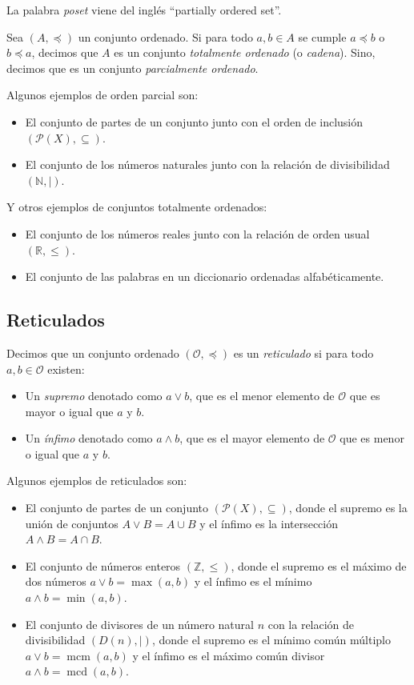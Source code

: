La palabra \textit{poset} viene del inglés ``partially ordered set''.

\begin{definition}
    Sea $(A, \preceq)$ un conjunto ordenado. Si para todo $a, b \in A$ se cumple $a \preceq b$ o $b \preceq a$, decimos que $A$ es un conjunto \emph{totalmente ordenado} (o \emph{cadena}). Sino, decimos que es un conjunto \emph{parcialmente ordenado}.
\end{definition}

Algunos ejemplos de orden parcial son:
\begin{itemize}
    \item El conjunto de partes de un conjunto junto con el orden de inclusión $(\mathcal{P}(X), \subseteq)$.
    \item El conjunto de los números naturales junto con la relación de divisibilidad $(\mathbb{N}, \mid)$.
\end{itemize}
Y otros ejemplos de conjuntos totalmente ordenados:
\begin{itemize}
    \item El conjunto de los números reales junto con la relación de orden usual $(\mathbb{R}, \leq)$.
    \item El conjunto de las palabras en un diccionario ordenadas alfabéticamente.
\end{itemize}


\subsection{Reticulados}

\begin{definition}
    Decimos que un conjunto ordenado $(\mathcal{O}, \preceq)$ es un \emph{reticulado} si para todo $a, b \in \mathcal{O}$ existen:
    \begin{itemize}
        \item Un \emph{supremo} denotado como $a \vee b$, que es el menor elemento de $\mathcal{O}$ que es mayor o igual que $a$ y $b$.
        \item Un \emph{ínfimo} denotado como $a \wedge b$, que es el mayor elemento de $\mathcal{O}$ que es menor o igual que $a$ y $b$.
    \end{itemize}
\end{definition}

Algunos ejemplos de reticulados son:
\begin{itemize}
    \item El conjunto de partes de un conjunto $(\mathcal{P}(X), \subseteq)$, donde el supremo es la unión de conjuntos $A \vee B = A \cup B$ y el ínfimo es la intersección $A \wedge B = A \cap B$.
    \item El conjunto de números enteros $(\mathbb{Z}, \leq)$, donde el supremo es el máximo de dos números $a \vee b = \max(a, b)$ y el ínfimo es el mínimo $a \wedge b = \min(a, b)$.
    \item El conjunto de divisores de un número natural $n$ con la relación de divisibilidad $(D(n), \mid)$, donde el supremo es el mínimo común múltiplo $a \vee b = \operatorname{mcm}(a, b)$ y el ínfimo es el máximo común divisor $a \wedge b = \operatorname{mcd}(a, b)$.
\end{itemize}

